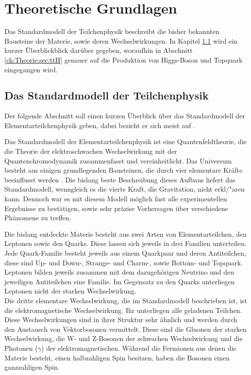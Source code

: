 \chapter{Theoretische Grundlagen}
\label{ch:Theorie}

{}	%

Das Standardmodell der Teilchenphysik beschreibt die bisher bekannten Bausteine der Materie, sowie deren Wechselwirkungen. In Kapitel \ref{ch:Theorie:sec:Standardmodell} wird ein kurzer \"Uberblickblick dar\"uber gegeben, woraufhin in Abschnitt \ref{ch:Theorie:sec:ttH} genauer auf die Produktion von Higgs-Boson und Topquark eingegangen wird.\\


\section{Das Standardmodell der Teilchenphysik}
\label{ch:Theorie:sec:Standardmodell}

Der folgende Abschnitt soll einen kurzen \"Uberblick \"uber das Standardmodell der Elementarteilchenphysik geben, dabei bezieht er sich meist auf \cite{SWB-39819646X}.

Das Standardmodell der Elementarteilchenphysik ist eine Quantenfeldtheorie, die die Theorie der elektroschwachen Wechselwirkung mit der Quantenchromodynamik zusammenfasst und vereinheitlicht. Das Universum besteht aus einigen grundlegenden Bausteinen, die durch vier elementare Kr\"afte beeinflusst werden \cite{O'Luanaigh:1997201}. Die bislang beste Beschreibung dieses Aufbaus liefert das Standardmodell, wenngleich es die vierte Kraft, die Gravitation, nicht erkl/"aren kann. Dennoch war es mit diesem Modell m\"oglich fast alle experimentellen Ergebnisse zu best\"atigen, sowie sehr pr\"azise Vorhersagen \"uber verschiedene Ph\"anomene zu treffen.

Die bislang entdeckte Materie besteht aus zwei Arten von Elementarteilchen, den Leptonen sowie den Quarks. Diese lassen sich jeweils in drei Familien unterteilen. Jede Quark-Familie besteht jeweils aus einem Quarkpaar und deren Antiteilchen, diese sind Up- und Down-, Strange- und Charm-, sowie Bottom- und Topquark.\\
Leptonen bilden jeweils zusammen mit dem dazugeh\"origen Neutrino und den jeweiligen Antiteilchen eine Familie. Im Gegensatz zu den Quarks unterliegen Leptonen nicht der starken Wechselwirkung.\\
Die dritte elementare Wechselwirkung, die im Standardmodell beschrieben ist, ist die elektromagnetische Wechselwirkung. Ihr unterliegen alle geladenen Teilchen. Diese Wechselwirkungen sind in ihrer Struktur sehr \"ahnlich und werden durch den Austausch von Vektorbosonen vermittelt. Diese sind die Gluonen der starken Wechselwirkung, die W- und Z-Bosonen der schwachen Wechselwirkung und die Photonen ($\gamma$) der elektromagnetischen. W\"ahrend die Fermionen aus denen die Materie besteht, einen halbzahligen Spin besitzen, haben die Bosonen einen ganzzahligen Spin.

